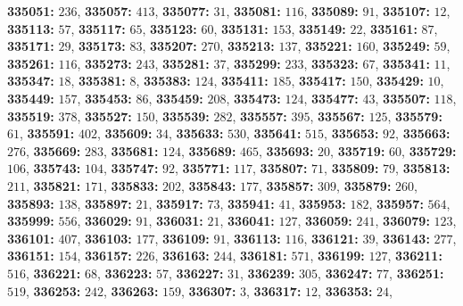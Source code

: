 \textsf{\bfseries 335051:} $236$, \textsf{\bfseries 335057:} $413$, \textsf{\bfseries 335077:} $31$, \textsf{\bfseries 335081:} $116$, \textsf{\bfseries 335089:} $91$, \textsf{\bfseries 335107:} $12$, \textsf{\bfseries 335113:} $57$, \textsf{\bfseries 335117:} $65$, \textsf{\bfseries 335123:} $60$, \textsf{\bfseries 335131:} $153$, \textsf{\bfseries 335149:} $22$, \textsf{\bfseries 335161:} $87$, \textsf{\bfseries 335171:} $29$, \textsf{\bfseries 335173:} $83$, \textsf{\bfseries 335207:} $270$, \textsf{\bfseries 335213:} $137$, \textsf{\bfseries 335221:} $160$, \textsf{\bfseries 335249:} $59$, \textsf{\bfseries 335261:} $116$, \textsf{\bfseries 335273:} $243$, \textsf{\bfseries 335281:} $37$, \textsf{\bfseries 335299:} $233$, \textsf{\bfseries 335323:} $67$, \textsf{\bfseries 335341:} $11$, \textsf{\bfseries 335347:} $18$, \textsf{\bfseries 335381:} $8$, \textsf{\bfseries 335383:} $124$, \textsf{\bfseries 335411:} $185$, \textsf{\bfseries 335417:} $150$, \textsf{\bfseries 335429:} $10$, \textsf{\bfseries 335449:} $157$, \textsf{\bfseries 335453:} $86$, \textsf{\bfseries 335459:} $208$, \textsf{\bfseries 335473:} $124$, \textsf{\bfseries 335477:} $43$, \textsf{\bfseries 335507:} $118$, \textsf{\bfseries 335519:} $378$, \textsf{\bfseries 335527:} $150$, \textsf{\bfseries 335539:} $282$, \textsf{\bfseries 335557:} $395$, \textsf{\bfseries 335567:} $125$, \textsf{\bfseries 335579:} $61$, \textsf{\bfseries 335591:} $402$, \textsf{\bfseries 335609:} $34$, \textsf{\bfseries 335633:} $530$, \textsf{\bfseries 335641:} $515$, \textsf{\bfseries 335653:} $92$, \textsf{\bfseries 335663:} $276$, \textsf{\bfseries 335669:} $283$, \textsf{\bfseries 335681:} $124$, \textsf{\bfseries 335689:} $465$, \textsf{\bfseries 335693:} $20$, \textsf{\bfseries 335719:} $60$, \textsf{\bfseries 335729:} $106$, \textsf{\bfseries 335743:} $104$, \textsf{\bfseries 335747:} $92$, \textsf{\bfseries 335771:} $117$, \textsf{\bfseries 335807:} $71$, \textsf{\bfseries 335809:} $79$, \textsf{\bfseries 335813:} $211$, \textsf{\bfseries 335821:} $171$, \textsf{\bfseries 335833:} $202$, \textsf{\bfseries 335843:} $177$, \textsf{\bfseries 335857:} $309$, \textsf{\bfseries 335879:} $260$, \textsf{\bfseries 335893:} $138$, \textsf{\bfseries 335897:} $21$, \textsf{\bfseries 335917:} $73$, \textsf{\bfseries 335941:} $41$, \textsf{\bfseries 335953:} $182$, \textsf{\bfseries 335957:} $564$, \textsf{\bfseries 335999:} $556$, \textsf{\bfseries 336029:} $91$, \textsf{\bfseries 336031:} $21$, \textsf{\bfseries 336041:} $127$, \textsf{\bfseries 336059:} $241$, \textsf{\bfseries 336079:} $123$, \textsf{\bfseries 336101:} $407$, \textsf{\bfseries 336103:} $177$, \textsf{\bfseries 336109:} $91$, \textsf{\bfseries 336113:} $116$, \textsf{\bfseries 336121:} $39$, \textsf{\bfseries 336143:} $277$, \textsf{\bfseries 336151:} $154$, \textsf{\bfseries 336157:} $226$, \textsf{\bfseries 336163:} $244$, \textsf{\bfseries 336181:} $571$, \textsf{\bfseries 336199:} $127$, \textsf{\bfseries 336211:} $516$, \textsf{\bfseries 336221:} $68$, \textsf{\bfseries 336223:} $57$, \textsf{\bfseries 336227:} $31$, \textsf{\bfseries 336239:} $305$, \textsf{\bfseries 336247:} $77$, \textsf{\bfseries 336251:} $519$, \textsf{\bfseries 336253:} $242$, \textsf{\bfseries 336263:} $159$, \textsf{\bfseries 336307:} $3$, \textsf{\bfseries 336317:} $12$, \textsf{\bfseries 336353:} $24$, 
